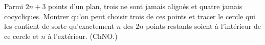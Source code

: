 Parmi $2n + 3$ points d'un plan, trois ne sont jamais alignés et quatre jamais cocycliques. Montrer qu'on peut choisir trois de ces points et tracer le cercle qui les contient de sorte qu'exactement $n$ des $2n$ points restants soient à l'intérieur de ce cercle et $n$ à l'extérieur. (ChNO.)
